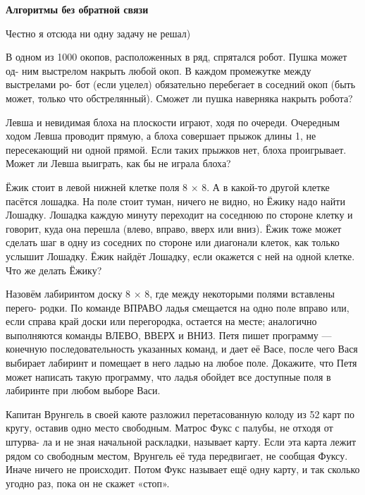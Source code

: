 \hspace{3mm}

\centerline{\bf \Huge Алгоритмы без обратной связи}

\begin{flushright}
    \scriptsize{Честно я отсюда ни одну задачу не решал)}
\end{flushright}


 В одном из 1000 окопов, расположенных в ряд, спрятался робот. Пушка может од- ним выстрелом накрыть любой окоп. В каждом промежутке между выстрелами ро- бот (если уцелел) обязательно перебегает в соседний окоп (быть может, только что обстрелянный). Сможет ли пушка наверняка накрыть робота?

 Левша и невидимая блоха на плоскости играют, ходя по очереди. Очередным ходом Левша проводит прямую, а блоха совершает прыжок длины 1, не пересекающий ни одной прямой. Если таких прыжков нет, блоха проигрывает. Может ли Левша выиграть, как бы не играла блоха?

 Ёжик стоит в левой нижней клетке поля 8 × 8. А в какой-то другой клетке пасётся лошадка. На поле стоит туман, ничего не видно, но Ёжику надо найти Лошадку. Лошадка каждую минуту переходит на соседнюю по стороне клетку и говорит, куда она перешла (влево, вправо, вверх или вниз). Ёжик тоже может сделать шаг в одну из соседних по стороне или диагонали клеток, как только услышит Лошадку. Ёжик найдёт Лошадку, если окажется с ней на одной клетке. Что же делать Ёжику?

 Назовём лабиринтом доску 8 × 8, где между некоторыми полями вставлены перего- родки. По команде ВПРАВО ладья смещается на одно поле вправо или, если справа край доски или перегородка, остается на месте; аналогично выполняются команды ВЛЕВО, ВВЕРХ и ВНИЗ. Петя пишет программу — конечную последовательность указанных команд, и дает её Васе, после чего Вася выбирает лабиринт и помещает в него ладью на любое поле. Докажите, что Петя может написать такую программу, что ладья обойдет все доступные поля в лабиринте при любом выборе Васи.

 Капитан Врунгель в своей каюте разложил перетасованную колоду из 52 карт по кругу, оставив одно место свободным. Матрос Фукс с палубы, не отходя от штурва- ла и не зная начальной раскладки, называет карту. Если эта карта лежит рядом со свободным местом, Врунгель её туда передвигает, не сообщая Фуксу. Иначе ничего не происходит. Потом Фукс называет ещё одну карту, и так сколько угодно раз, пока он не скажет «стоп».

